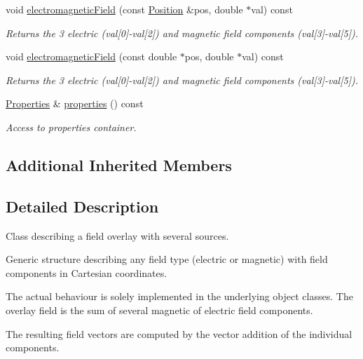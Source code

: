 \begin{DoxyCompactItemize}
void \hyperlink{class_d_d4hep_1_1_geometry_1_1_overlayed_field_ac729f9f8cc7e8df1d5be1cd5a5431bf2}{electromagnetic\+Field} (const \hyperlink{namespace_d_d4hep_1_1_geometry_a55083902099d03506c6db01b80404900}{Position} \&pos, double $\ast$val) const
\begin{DoxyCompactList}\small\item\em Returns the 3 electric (val\mbox{[}0\mbox{]}-\/val\mbox{[}2\mbox{]}) and magnetic field components (val\mbox{[}3\mbox{]}-\/val\mbox{[}5\mbox{]}). \end{DoxyCompactList}\item 
void \hyperlink{class_d_d4hep_1_1_geometry_1_1_overlayed_field_a8b9cc4d26ec79890f5495b34f9de47c5}{electromagnetic\+Field} (const double $\ast$pos, double $\ast$val) const
\begin{DoxyCompactList}\small\item\em Returns the 3 electric (val\mbox{[}0\mbox{]}-\/val\mbox{[}2\mbox{]}) and magnetic field components (val\mbox{[}3\mbox{]}-\/val\mbox{[}5\mbox{]}). \end{DoxyCompactList}\item 
\hyperlink{class_d_d4hep_1_1_geometry_1_1_overlayed_field_acdf81fbf8e0c336cb724ee2846a2c5b0}{Properties} \& \hyperlink{class_d_d4hep_1_1_geometry_1_1_overlayed_field_a077f2eb70eacb81446388ef117dd32b5}{properties} () const
\begin{DoxyCompactList}\small\item\em Access to properties container. \end{DoxyCompactList}\end{DoxyCompactItemize}
\subsection*{Additional Inherited Members}


\subsection{Detailed Description}
Class describing a field overlay with several sources. 

Generic structure describing any field type (electric or magnetic) with field components in Cartesian coordinates.

The actual behaviour is solely implemented in the underlying object classes. The overlay field is the sum of several magnetic of electric field components.

The resulting field vectors are computed by the vector addition of the individual components.

